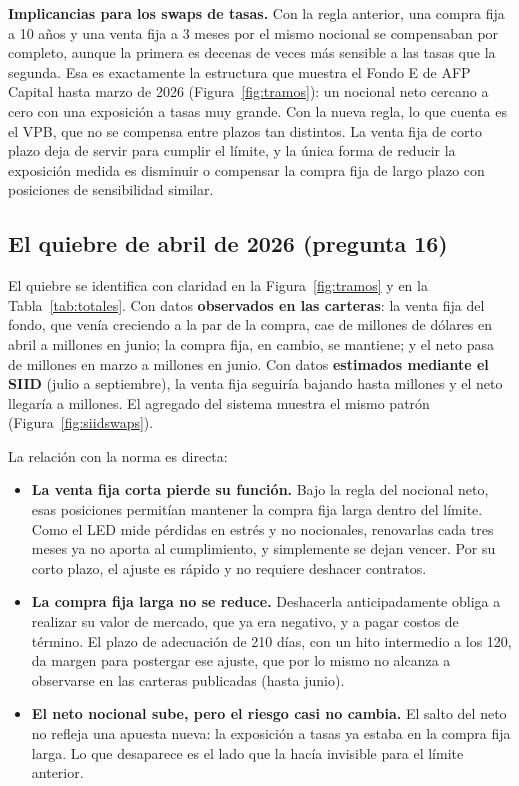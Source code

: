 \documentclass[11pt,letterpaper]{article}
\begin{document}
\textbf{Implicancias para los swaps de tasas.} Con la regla anterior, una compra fija a
10 años y una venta fija a 3 meses por el mismo nocional se compensaban por completo,
aunque la primera es decenas de veces más sensible a las tasas que la segunda. Esa es
exactamente la estructura que muestra el Fondo E de AFP Capital hasta marzo de 2026
(Figura~\ref{fig:tramos}): un nocional neto cercano a cero con una exposición a tasas
muy grande. Con la nueva regla, lo que cuenta es el VPB, que no se compensa entre
plazos tan distintos. La venta fija de corto plazo deja de servir para cumplir el
límite, y la única forma de reducir la exposición medida es disminuir o compensar la
compra fija de largo plazo con posiciones de sensibilidad similar.

\subsection{El quiebre de abril de 2026 (pregunta 16)}

El quiebre se identifica con claridad en la Figura~\ref{fig:tramos} y en la
Tabla~\ref{tab:totales}. Con datos \textbf{observados en las carteras}: la venta fija
del fondo, que venía creciendo a la par de la compra, cae de \MIIventaAbr{} millones de
dólares en abril a \MIIventaBase{} millones en junio; la compra fija, en cambio, se
mantiene; y el neto pasa de \MIInetoMar{} millones en marzo a \MIInetoBase{} millones
en junio. Con datos \textbf{estimados mediante el SIID} (julio a septiembre), la venta
fija seguiría bajando hasta \MIIventaFin{} millones y el neto llegaría a \MIInetoFin{}
millones. El agregado del sistema muestra el mismo patrón
(Figura~\ref{fig:siidswaps}).

La relación con la norma es directa:

\begin{itemize}[leftmargin=*]
\item \textbf{La venta fija corta pierde su función.} Bajo la regla del nocional neto,
esas posiciones permitían mantener la compra fija larga dentro del límite. Como el LED
mide pérdidas en estrés y no nocionales, renovarlas cada tres meses ya no aporta al
cumplimiento, y simplemente se dejan vencer. Por su corto plazo, el ajuste es rápido y
no requiere deshacer contratos.
\item \textbf{La compra fija larga no se reduce.} Deshacerla anticipadamente obliga a
realizar su valor de mercado, que ya era negativo, y a pagar costos de término. El
plazo de adecuación de 210 días, con un hito intermedio a los 120, da margen para
postergar ese ajuste, que por lo mismo no alcanza a observarse en las carteras
publicadas (hasta junio).
\item \textbf{El neto nocional sube, pero el riesgo casi no cambia.} El salto del neto
no refleja una apuesta nueva: la exposición a tasas ya estaba en la compra fija larga.
Lo que desaparece es el lado que la hacía invisible para el límite anterior.
\end{itemize}
\end{document}
